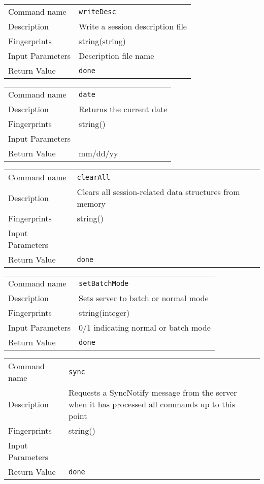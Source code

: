 \noindent
\begin{tabular}{l|p{5in}}
\hline
Command name &{\tt writeDesc }\\ 
Description &
Write a session description file
 	\\
Fingerprints & string(string)\\
Input Parameters&Description file name\\
Return Value&{\tt done}\\
\hline
\end{tabular}
\bigskip

\noindent
\begin{tabular}{l|p{5in}}
\hline
Command name &{\tt date }\\ 
Description &
 Returns the current date 
 	\\
Fingerprints & string()\\
Input Parameters&\\
Return Value& mm/dd/yy \\
\hline
\end{tabular}
\bigskip

\noindent
\begin{tabular}{l|p{5in}}
\hline
Command name &{\tt clearAll }\\ 
Description &
 Clears all session-related data structures from memory 
 	\\
Fingerprints & string()\\
Input Parameters&\\
Return Value&{\tt done}\\
\hline
\end{tabular}
\bigskip

\noindent
\begin{tabular}{l|p{5in}}
\hline
Command name &{\tt setBatchMode }\\ 
Description &
 Sets server to batch or normal mode 
 	\\
Fingerprints & string(integer)\\
Input Parameters& 0/1 indicating normal or batch mode \\
Return Value&{\tt done}\\
\hline
\end{tabular}
\bigskip

\noindent
\begin{tabular}{l|p{5in}}
\hline
Command name &{\tt sync }\\ 
Description &
 Requests a SyncNotify message from the server when it has processed all commands up to this point 
 	\\
Fingerprints & string()\\
Input Parameters&\\
Return Value&{\tt done}\\
\hline
\end{tabular}
\bigskip

